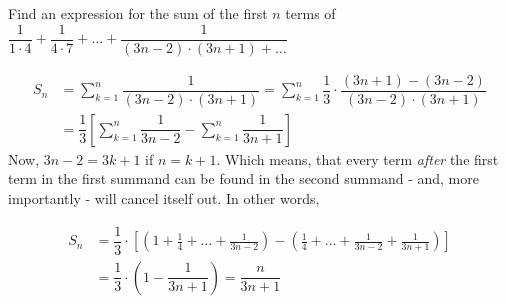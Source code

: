 
%
%
%
%
% 
% 

\question[3] Find an expression for the sum of the first $n$ terms of 
$\dfrac{1}{1\cdot 4} + \dfrac{1}{4\cdot 7} + \ldots + \dfrac{1}{(3n-2)\cdot(3n+1) + \ldots}$


\ifprintanswers
\fi 

\begin{solution}[\halfpage]
	\begin{align}
		S_n &= \sum_{k=1}^{n}\dfrac{1}{(3n-2)\cdot(3n+1)} = 
		\sum_{k=1}^{n}\dfrac{1}{3}\cdot\dfrac{(3n+1) - (3n-2)}{(3n-2)\cdot(3n+1)} \\
		&= \dfrac{1}{3}\left[ \sum_{k=1}^{n}\dfrac{1}{3n-2} - \sum_{k=1}^{n}\dfrac{1}{3n+1}\right]
	\end{align}
	Now, $3n-2 = 3k + 1$ if $n = k + 1$. Which means, that every term \textit{after} the first
	term in the first summand can be found in the second summand - and, more importantly - will 
	cancel itself out. In other words,
	
	\begin{align}
		S_n &= \dfrac{1}{3}\cdot\left[\left( 1+\frac{1}{4}+\ldots +\frac{1}{3n-2}\right)
		- \left( \frac{1}{4} + \ldots + \frac{1}{3n-2} + \frac{1}{3n+1}\right) \right] \\
		&= \dfrac{1}{3}\cdot\left( 1-\dfrac{1}{3n+1}\right) = \dfrac{n}{3n+1}
	\end{align}
\end{solution}
